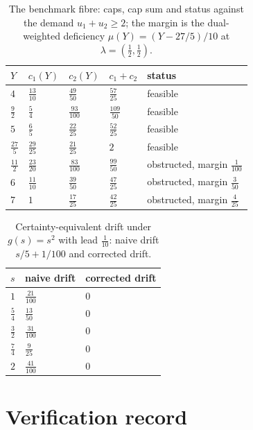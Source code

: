 \documentclass[11pt,a4paper]{article}
\theoremstyle{plain}
\theoremstyle{definition}
\theoremstyle{remark}
\begin{document}
\begin{table}[H]
\centering\small
\caption{The benchmark fibre: caps, cap sum and status against the demand $u_1+u_2\ge 2$; the margin is the dual-weighted deficiency $\mu(Y)=(Y-27/5)/10$ at $\lambda=(\tfrac12,\tfrac12)$.}
\label{tab:bench}
\begin{tabular}{lllll}
\toprule
$Y$ & $c_1(Y)$ & $c_2(Y)$ & $c_1+c_2$ & status \\
\midrule
$4$ & $\tfrac{13}{10}$ & $\tfrac{49}{50}$ & $\tfrac{57}{25}$ & feasible \\
$\tfrac{9}{2}$ & $\tfrac{5}{4}$ & $\tfrac{93}{100}$ & $\tfrac{109}{50}$ & feasible \\
$5$ & $\tfrac{6}{5}$ & $\tfrac{22}{25}$ & $\tfrac{52}{25}$ & feasible \\
$\tfrac{27}{5}$ & $\tfrac{29}{25}$ & $\tfrac{21}{25}$ & $2$ & feasible \\
$\tfrac{11}{2}$ & $\tfrac{23}{20}$ & $\tfrac{83}{100}$ & $\tfrac{99}{50}$ & obstructed, margin $\tfrac{1}{100}$ \\
$6$ & $\tfrac{11}{10}$ & $\tfrac{39}{50}$ & $\tfrac{47}{25}$ & obstructed, margin $\tfrac{3}{50}$ \\
$7$ & $1$ & $\tfrac{17}{25}$ & $\tfrac{42}{25}$ & obstructed, margin $\tfrac{4}{25}$ \\
\bottomrule
\end{tabular}
\end{table}
\begin{table}[H]
\centering\small
\caption{Certainty-equivalent drift under $g(s)=s^2$ with lead $\tfrac1{10}$: naive drift $s/5+1/100$ and corrected drift.}
\label{tab:drift}
\begin{tabular}{lll}
\toprule
$s$ & naive drift & corrected drift \\
\midrule
$1$ & $\tfrac{21}{100}$ & $0$ \\
$\tfrac{5}{4}$ & $\tfrac{13}{50}$ & $0$ \\
$\tfrac{3}{2}$ & $\tfrac{31}{100}$ & $0$ \\
$\tfrac{7}{4}$ & $\tfrac{9}{25}$ & $0$ \\
$2$ & $\tfrac{41}{100}$ & $0$ \\
\bottomrule
\end{tabular}
\end{table}
\section{Verification record}\label{si:verification}
\end{document}
